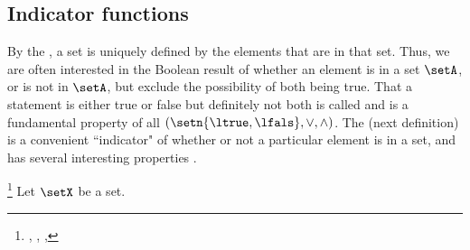 
\subsection{Indicator functions}
By the , a set is uniquely defined by the elements
that are in that set.
Thus, we are often interested in the Boolean result of whether an element is in
a set $\setA$, or is not in $\setA$, but exclude the possibility of both being true.
That a statement is either true or false but definitely not both is called
 and is a fundamental property of
all  $(\setn{\ltrue,\lfals},\lor,\land)$.
The  (next definition) is a convenient
``indicator" of whether or not a particular element is in a set,
and has several interesting properties .
\begin{definition}
\footnote{
  , %
  ,
  ,
  }
\label{def:setind}
Let $\setX$ be a set.
\end{definition}

